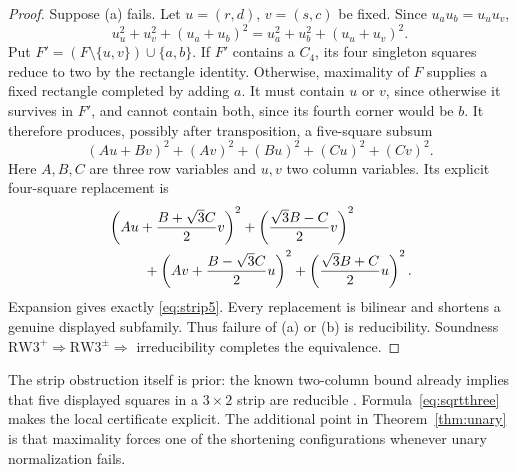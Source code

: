 \documentclass[11pt,a4paper]{article}
\theoremstyle{definition}
\newcommand{\RW}{\mathrm{RW3}^{+}}
\newcommand{\SG}{\mathrm{RW3}^{\pm}}
\begin{document}
\begin{proof}
Suppose (a) fails. Let $u=(r,d)$, $v=(s,c)$ be fixed. Since $u_au_b=u_uu_v$,
\begin{equation}\label{eq:switch}
 u_u^2+u_v^2+(u_a+u_b)^2
       =u_a^2+u_b^2+(u_u+u_v)^2.
\end{equation}
Put $F'=(F\setminus\{u,v\})\cup\{a,b\}$. If $F'$ contains a $C_4$,
its four singleton squares reduce to two by the rectangle identity.
Otherwise, maximality of $F$ supplies a fixed rectangle completed by
adding $a$. It must contain $u$ or $v$, since otherwise it survives in
$F'$, and cannot contain both, since its fourth corner would be $b$.
It therefore produces, possibly after transposition, a five-square
subsum
\begin{equation}\label{eq:strip5}
 (Au+Bv)^2+(Av)^2+(Bu)^2+(Cu)^2+(Cv)^2.
\end{equation}
Here $A,B,C$ are three row variables and $u,v$ two column variables.
Its explicit four-square replacement is
\begin{align}\label{eq:sqrtthree}
 &\left(Au+\frac{B+\sqrt3C}{2}v\right)^2
 +\left(\frac{\sqrt3B-C}{2}v\right)^2 \notag\\
 &\hspace{9mm}+\left(Av+\frac{B-\sqrt3C}{2}u\right)^2
 +\left(\frac{\sqrt3B+C}{2}u\right)^2.
\end{align}
Expansion gives exactly \eqref{eq:strip5}. Every replacement is bilinear
and shortens a genuine displayed subfamily. Thus failure of (a) or (b)
is reducibility. Soundness $\RW\Rightarrow\SG\Rightarrow$ irreducibility
completes the equivalence.
\end{proof}

The strip obstruction itself is prior: the known two-column bound already
implies that five displayed squares in a $3\times2$ strip are reducible
\cite[Appendix~B.1]{LQ}. Formula~\eqref{eq:sqrtthree} makes the local
certificate explicit. The additional point in Theorem~\ref{thm:unary}
is that maximality forces one of the shortening configurations whenever
unary normalization fails.
\end{document}
